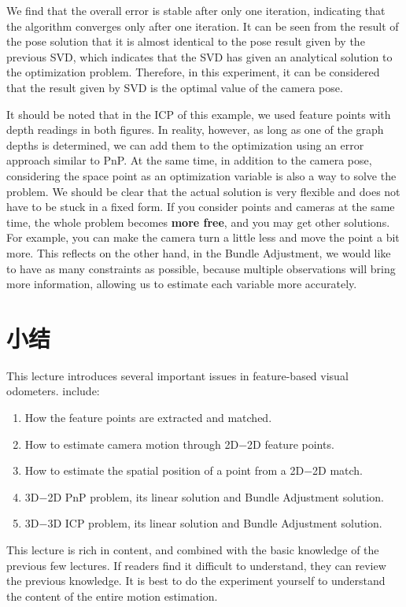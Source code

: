 We find that the overall error is stable after only one iteration, indicating that the algorithm converges only after one iteration. It can be seen from the result of the pose solution that it is almost identical to the pose result given by the previous SVD, which indicates that the SVD has given an analytical solution to the optimization problem. Therefore, in this experiment, it can be considered that the result given by SVD is the optimal value of the camera pose.

It should be noted that in the ICP of this example, we used feature points with depth readings in both figures. In reality, however, as long as one of the graph depths is determined, we can add them to the optimization using an error approach similar to PnP. At the same time, in addition to the camera pose, considering the space point as an optimization variable is also a way to solve the problem. We should be clear that the actual solution is very flexible and does not have to be stuck in a fixed form. If you consider points and cameras at the same time, the whole problem becomes \textbf{more free}, and you may get other solutions. For example, you can make the camera turn a little less and move the point a bit more. This reflects on the other hand, in the Bundle Adjustment, we would like to have as many constraints as possible, because multiple observations will bring more information, allowing us to estimate each variable more accurately.

\section{小结}
This lecture introduces several important issues in feature-based visual odometers. include:

\begin{enumerate}
\item How the feature points are extracted and matched.
\item How to estimate camera motion through 2D−2D feature points.
\item How to estimate the spatial position of a point from a 2D−2D match.
\item 3D−2D PnP problem, its linear solution and Bundle Adjustment solution.
\item 3D−3D ICP problem, its linear solution and Bundle Adjustment solution.
\end{enumerate}

This lecture is rich in content, and combined with the basic knowledge of the previous few lectures. If readers find it difficult to understand, they can review the previous knowledge. It is best to do the experiment yourself to understand the content of the entire motion estimation.

